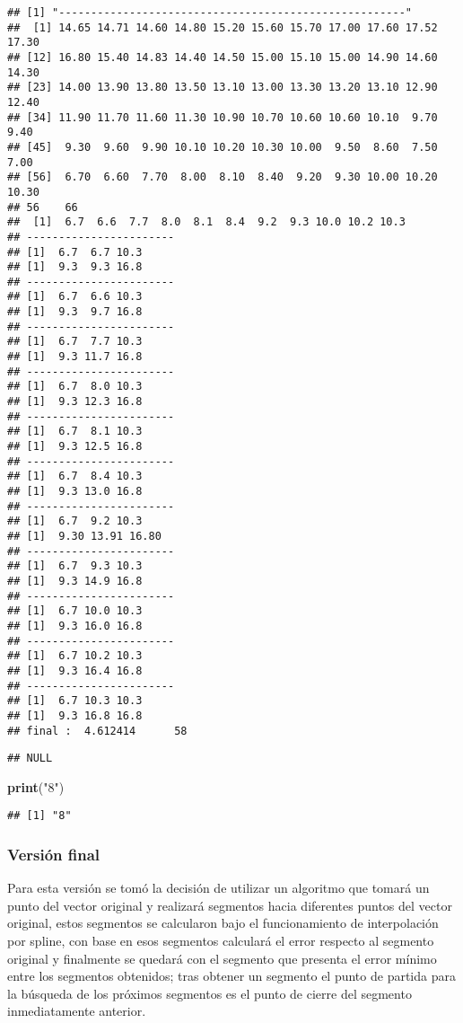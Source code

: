 \documentclass[]{article}
\newenvironment{Shaded}{\begin{snugshade}}{\end{snugshade}}
\newcommand{\KeywordTok}[1]{\textcolor[rgb]{0.13,0.29,0.53}{\textbf{#1}}}
\newcommand{\StringTok}[1]{\textcolor[rgb]{0.31,0.60,0.02}{#1}}
\newcommand{\NormalTok}[1]{#1}
\begin{document}
\begin{verbatim}
## [1] "------------------------------------------------------"
##  [1] 14.65 14.71 14.60 14.80 15.20 15.60 15.70 17.00 17.60 17.52 17.30
## [12] 16.80 15.40 14.83 14.40 14.50 15.00 15.10 15.00 14.90 14.60 14.30
## [23] 14.00 13.90 13.80 13.50 13.10 13.00 13.30 13.20 13.10 12.90 12.40
## [34] 11.90 11.70 11.60 11.30 10.90 10.70 10.60 10.60 10.10  9.70  9.40
## [45]  9.30  9.60  9.90 10.10 10.20 10.30 10.00  9.50  8.60  7.50  7.00
## [56]  6.70  6.60  7.70  8.00  8.10  8.40  9.20  9.30 10.00 10.20 10.30
## 56    66 
##  [1]  6.7  6.6  7.7  8.0  8.1  8.4  9.2  9.3 10.0 10.2 10.3
## -----------------------
## [1]  6.7  6.7 10.3
## [1]  9.3  9.3 16.8
## -----------------------
## [1]  6.7  6.6 10.3
## [1]  9.3  9.7 16.8
## -----------------------
## [1]  6.7  7.7 10.3
## [1]  9.3 11.7 16.8
## -----------------------
## [1]  6.7  8.0 10.3
## [1]  9.3 12.3 16.8
## -----------------------
## [1]  6.7  8.1 10.3
## [1]  9.3 12.5 16.8
## -----------------------
## [1]  6.7  8.4 10.3
## [1]  9.3 13.0 16.8
## -----------------------
## [1]  6.7  9.2 10.3
## [1]  9.30 13.91 16.80
## -----------------------
## [1]  6.7  9.3 10.3
## [1]  9.3 14.9 16.8
## -----------------------
## [1]  6.7 10.0 10.3
## [1]  9.3 16.0 16.8
## -----------------------
## [1]  6.7 10.2 10.3
## [1]  9.3 16.4 16.8
## -----------------------
## [1]  6.7 10.3 10.3
## [1]  9.3 16.8 16.8
## final :  4.612414      58
\end{verbatim}

\begin{verbatim}
## NULL
\end{verbatim}

\begin{Shaded}
\begin{Highlighting}[]
\KeywordTok{print}\NormalTok{(}\StringTok{"8"}\NormalTok{)}
\end{Highlighting}
\end{Shaded}

\begin{verbatim}
## [1] "8"
\end{verbatim}

\subsubsection{Versión final}\label{version-final}

Para esta versión se tomó la decisión de utilizar un algoritmo que
tomará un punto del vector original y realizará segmentos hacia
diferentes puntos del vector original, estos segmentos se calcularon
bajo el funcionamiento de interpolación por spline, con base en esos
segmentos calculará el error respecto al segmento original y finalmente
se quedará con el segmento que presenta el error mínimo entre los
segmentos obtenidos; tras obtener un segmento el punto de partida para
la búsqueda de los próximos segmentos es el punto de cierre del segmento
inmediatamente anterior.
\end{document}
